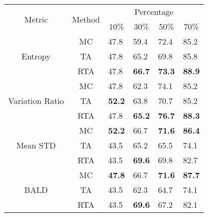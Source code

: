 \begin{table}[t]
\centering
\scriptsize
\setlength\belowcaptionskip{-20pt}
\begin{minipage}{.5\textwidth}
\begin{tabular}{ccllll}
\hline
\multirow{2}{*}{Metric}          & \multirow{2}{*}{Method} & \multicolumn{4}{c}{Percentage}                                                                            \\
                                 &                         & \multicolumn{1}{c}{10\%} & \multicolumn{1}{c}{30\%} & \multicolumn{1}{c}{50\%} & \multicolumn{1}{c}{70\%} \\ \hline\hline
\multirow{3}{*}{Entropy}         & MC                      & 47.8                     & 59.4                     & 72.4                     & 85.2                     \\
                                 & TA                      & 47.8                     & 65.2                     & 69.8                     & 85.8                     \\
                                 & RTA                     & 47.8                     & \textbf{66.7}            & \textbf{73.3}            & \textbf{88.9}            \\ \hline
\multirow{3}{*}{Variation Ratio} & MC                      & 47.8                     & 62.3                     & 74.1                     & 85.2                     \\
                                 & TA                      & \textbf{52.2}            & 63.8                     & 70.7                     & 85.2                     \\
                                 & RTA                     & 47.8                     & \textbf{65.2}            & \textbf{76.7}            & \textbf{88.3}            \\ \hline
\multirow{3}{*}{Mean STD}        & MC                      & \textbf{52.2}            & 66.7                     & \textbf{71.6}            & \textbf{86.4}            \\
                                 & TA                      & 43.5                     & 65.2                     & 65.5                     & 74.1                     \\
                                 & RTA                     & 43.5                     & \textbf{69.6}            & 69.8                     & 82.7                     \\ \hline
\multirow{3}{*}{BALD}            & MC                      & \textbf{47.8}            & 66.7                     & \textbf{71.6}            & \textbf{87.7}            \\
                                 & TA                      & 43.5                     & 62.3                     & 64.7                     & 74.1                     \\
                                 & RTA                     & 43.5                     & \textbf{69.6}            & 67.2                     & 82.1                      \\ \hline
\end{tabular}
  

\end{minipage}
\end{table}
